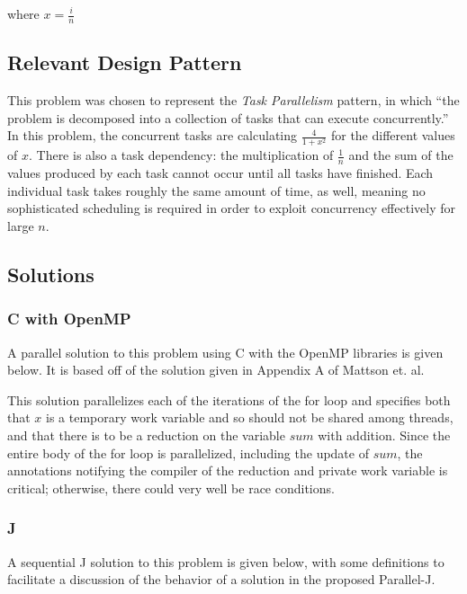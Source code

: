 where $x = \frac{i}{n}$

\subsection{Relevant Design Pattern}
This problem was chosen to represent the \textit{Task Parallelism} pattern, 
in which ``the problem is decomposed into a collection of tasks that can execute concurrently.'' %
In this problem, the concurrent tasks are calculating $\frac{4}{1 + x^2}$ for the different values of $x$. 
There is also a task dependency: the multiplication of $\frac{1}{n}$ and the sum of the values produced by each task 
cannot occur until all tasks have finished. 
Each individual task takes roughly the same amount of time, as well, 
meaning no sophisticated scheduling is required in order to exploit concurrency effectively for large $n$.

\subsection{Solutions}
\subsubsection{C with OpenMP}
A parallel solution to this problem using C with the OpenMP libraries is given below. 
It is based off of the solution given in Appendix A of Mattson et. al. %



This solution parallelizes each of the iterations of the for loop 
and specifies both that $x$ is a temporary work variable and so should not be shared among threads, 
and that there is to be a reduction on the variable $sum$ with addition. 
Since the entire body of the for loop is parallelized, including the update of $sum$, 
the annotations notifying the compiler of the reduction and private work variable is critical; 
otherwise, there could very well be race conditions.

\subsubsection{J}
A sequential J solution to this problem is given below, 
with some definitions to facilitate a discussion 
of the behavior of a solution in the proposed Parallel-J. %



